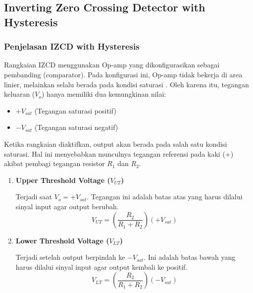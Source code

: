 \documentclass{article}
\begin{document}
\subsection*{Inverting Zero Crossing Detector with Hysteresis }

\subsubsection*{Penjelasan IZCD with Hysteresis}

Rangkaian IZCD menggunakan Op-amp yang dikonfigurasikan sebagai pembanding (comparator). Pada konfigurasi ini, Op-amp tidak bekerja di area linier, melainkan selalu berada pada kondisi saturasi \cite{pujiono2012rangkaian}. Oleh karena itu, tegangan keluaran ($V_o$) hanya memiliki dua kemungkinan nilai:

\begin{itemize}
    \item $+V_{sat}$ (Tegangan saturasi positif)
    \item $-V_{sat}$ (Tegangan saturasi negatif)
\end{itemize}

Ketika rangkaian diaktifkan, output akan berada pada salah satu kondisi saturasi. Hal ini menyebabkan munculnya tegangan referensi pada kaki (+) akibat pembagi tegangan resistor $R_1$ dan $R_2$.

\begin{enumerate}
    \item [a. ]\textbf{Upper Threshold Voltage ($V_{UT}$)}
    
    Terjadi saat $V_o = +V_{sat}$. Tegangan ini adalah batas atas yang harus dilalui sinyal input agar output berubah.
    $$V_{UT} = \left( \frac{R_2}{R_1 + R_2} \right) (+V_{sat})$$
    
    \item [b. ]\textbf{Lower Threshold Voltage ($V_{LT}$)}
    
    Terjadi setelah output berpindah ke $-V_{sat}$. Ini adalah batas bawah yang harus dilalui sinyal input agar output kembali ke positif.
    $$V_{LT} = \left( \frac{R_2}{R_1 + R_2} \right) (-V_{sat})$$
\end{enumerate}
\end{document}
